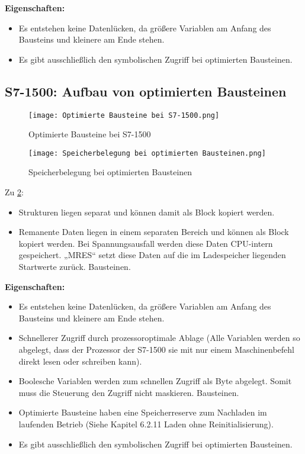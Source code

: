 \textbf{Eigenschaften:}\par\noindent
\begin{itemize}
    \item Es entstehen keine Datenlücken, da größere Variablen am Anfang des Bausteins und kleinere am Ende stehen.
    \item Es gibt ausschließlich den symbolischen Zugriff bei optimierten Bausteinen.   
\end{itemize}

\clearpage
\subsection{S7-1500: Aufbau von optimierten Bausteinen}\label{subsec:S7-1500: Aufbau von optimierten Bausteinen}

\begin{figure}[!ht]
    \centering
    \texttt{[image: Optimierte Bausteine bei S7-1500.png]}
    \caption{Optimierte Bausteine bei S7-1500}
    \label{fig:Optimierte Bausteine bei S7-1500}
\end{figure}
\begin{figure}[!ht]
    \centering
    \texttt{[image: Speicherbelegung bei optimierten Bausteinen.png]}
    \caption{Speicherbelegung bei optimierten Bausteinen}
    \label{fig:Speicherbelegung bei optimierten Bausteinen}
\end{figure}

Zu \cref{fig:Speicherbelegung bei optimierten Bausteinen}: \par \noindent
\begin{itemize}
    \item Strukturen liegen separat und können damit als Block kopiert werden.
    \item Remanente Daten liegen in einem separaten Bereich und können als Block kopiert werden. Bei Spannungsausfall werden diese Daten CPU-intern gespeichert. „MRES“ setzt diese Daten auf die im Ladespeicher liegenden Startwerte zurück.
     Bausteinen.   
\end{itemize}

\textbf{Eigenschaften:}\par\noindent
\begin{itemize}
    \item Es entstehen keine Datenlücken, da größere Variablen am Anfang des Bausteins und kleinere am Ende stehen.
    \item Schnellerer Zugriff durch prozessoroptimale Ablage (Alle Variablen werden so abgelegt, dass der Prozessor der S7-1500 sie mit nur einem Maschinenbefehl direkt lesen oder schreiben kann).
    \item Boolesche Variablen werden zum schnellen Zugriff als Byte abgelegt. Somit muss die Steuerung den Zugriff nicht maskieren.
    Bausteinen.   
    \item Optimierte Bausteine haben eine Speicherreserve zum Nachladen im laufenden Betrieb (Siehe Kapitel 6.2.11 Laden ohne Reinitialisierung).
    \item Es gibt ausschließlich den symbolischen Zugriff bei optimierten Bausteinen.
\end{itemize}


